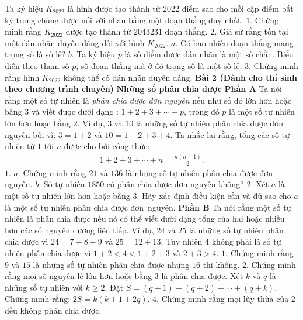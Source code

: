 \begin{multicols}{2}
	Ta ký hiệu $K_{2022}$ là hình được tạo thành từ $2022$ điểm sao cho mỗi cặp điểm bất kỳ trong chúng được nối với nhau bằng một đoạn thẳng duy nhất.
	\vskip 0.05cm
	$1.$ Chứng minh rằng $K_{2022}$ được tạo thành từ $2 043 231$ đoạn thẳng.
	\vskip 0.05cm
	$2.$ Giả sử rằng tồn tại một dán nhãn duyên dáng đối với hình $K_{2022}$.
	\vskip 0.05cm
	$a.$ Có bao nhiêu đoạn thẳng mang trọng số là số lẻ?
	\vskip 0.05cm
	$b.$ Ta ký hiệu $p$ là số điểm được dán nhãn là một số chẵn. Biểu diễn theo tham số $p$, số đoạn thẳng mà ở đó trọng số là một số lẻ.
	\vskip 0.05cm 
	$3.$ Chứng minh rằng hình $K_{2022}$ không thể có dán nhãn duyên dáng.
	\vskip 0.05cm
	\textbf{\color{cackithi}Bài $\pmb{2}$ (Dành cho thí sinh theo chương trình chuyên)}
	\vskip 0.05cm
	\textbf{\color{cackithi}Những số phân chia được}
	\vskip 0.05cm
	\textbf{\color{cackithi}Phần A}
	\vskip 0.05cm
	Ta nói rằng một số tự nhiên là \textit{phân chia được đơn nguyên} nếu như số đó lớn hơn hoặc bằng $3$ và viết được dưới dạng : $1+2+3+\cdots +p$, trong đó $p$ là một số tự nhiên lớn hơn hoặc bằng $2$. Ví dụ, $3$ và $10$ là những số tự nhiên phân chia được đơn nguyên bởi vì: $3 =1+2$  và $10=1+2+3+4$.
	\vskip 0.05cm 
	Ta nhắc lại rằng, tổng các số tự nhiên từ $1$ tới $n$ được cho bởi công thức:
	\begin{align*}
		1+2+3+\cdots+n=\frac{n(n+1)}{2}.
	\end{align*}
	$1.$ $a.$ Chứng minh rằng $21$ và $136$ là những số tự nhiên phân chia được đơn nguyên.  
	\vskip 0.05cm
	$b.$ Số tự nhiên $1850$ có phân chia được đơn nguyên không?
	\vskip 0.05cm
	$2.$ Xét $a$ là một số tự nhiên lớn hơn hoặc bằng $3$. Hãy xác định điều kiện cần và đủ sao cho $a$ là một số tự nhiên phân chia được đơn~nguyên. 
	\vskip 0.05cm
	\textbf{\color{cackithi}Phần B}
	\vskip 0.05cm
	Ta nói rằng một số tự nhiên là phân chia được nếu nó có thể viết dưới dạng tổng của hai hoặc nhiều hơn các số nguyên dương liên tiếp. Ví dụ, $24$ và $25$ là những số tự nhiên phân chia được vì $24 = 7 + 8 + 9$ và $25 = 12 + 13$. Tuy nhiên $4$ không phải là số tự nhiên phân chia được vì $1 + 2 < 4 < 1 + 2 + 3$ và $2 + 3 > 4$.
	\vskip 0.05cm
	$1.$ Chứng minh rằng $9$ và $15$ là những số tự nhiên phân chia được nhưng $16$ thì không.
	\vskip 0.05cm
	$2.$ Chứng minh rằng mọi số nguyên lẻ lớn hơn hoặc bằng $3$ là phân chia được. 
	\vskip 0.05cm
	Xét $k$ và $q$ là những số tự nhiên với $k\ge 2$.  Đặt $S=(q+1)+(q+2)+\cdots+(q+k)$. Chứng minh rằng: $2S=k(k+1+2q)$.
	\vskip 0.05cm
	$4.$ Chứng minh rằng mọi lũy thừa của $2$ đều không phân chia được. 

\end{multicols}
